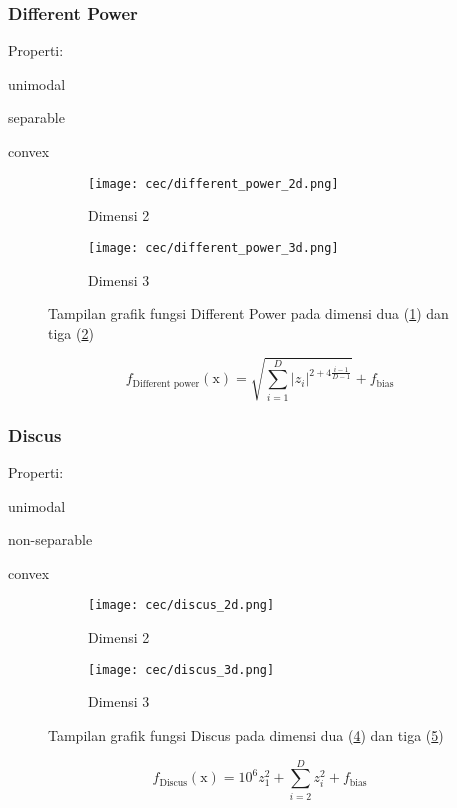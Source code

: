 \subsubsection{Different Power}
\noindent Properti:
\begin{packed_item}
  \item unimodal
  \item separable
  \item convex
\end{packed_item}
\begin{figure}[H]
	\centering
	\begin{subfigure}[b]{0.4\textwidth}
		\centering
		\texttt{[image: cec/different\_power\_2d.png]}
		\caption{Dimensi 2}
		\label{fig:diffpower-2d}
	\end{subfigure}
	\hfill
	\begin{subfigure}[b]{0.4\textwidth}
		\centering
		\texttt{[image: cec/different\_power\_3d.png]}
		\caption{Dimensi 3}
		\label{fig:diffpower-3d}
	\end{subfigure}
	\caption{Tampilan grafik fungsi Different Power pada dimensi dua (\cref{fig:diffpower-2d}) dan tiga (\cref{fig:diffpower-3d})}
	\label{fig:diffpower}
\end{figure}
\begin{equation}
  f_{\text{Different power}}(\mathrm{x})=\sqrt{\sum_{i=1}^{D}\left| z_i \right|^{2+4\frac{i-1}{D-1}} }+f_{\text{bias}}
\end{equation}

\subsubsection{Discus}
\noindent Properti:
\begin{packed_item}
  \item unimodal
  \item non-separable
  \item convex
\end{packed_item}
\begin{figure}[H]
	\centering
	\begin{subfigure}[b]{0.4\textwidth}
		\centering
		\texttt{[image: cec/discus\_2d.png]}
		\caption{Dimensi 2}
		\label{fig:discus-2d}
	\end{subfigure}
	\hfill
	\begin{subfigure}[b]{0.4\textwidth}
		\centering
		\texttt{[image: cec/discus\_3d.png]}
		\caption{Dimensi 3}
		\label{fig:discus-3d}
	\end{subfigure}
	\caption{Tampilan grafik fungsi Discus pada dimensi dua (\cref{fig:discus-2d}) dan tiga (\cref{fig:discus-3d})}
	\label{fig:discus}
\end{figure}
\begin{equation}
  f_{\text{Discus}}(\mathrm{x})=10^6z_1^2+\sum_{i=2}^{D}z_i^2+f_{\text{bias}}
\end{equation}

